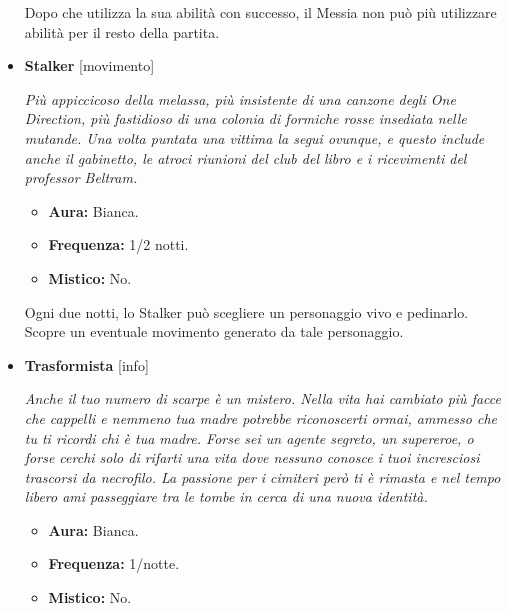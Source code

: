 \documentclass[a4paper,10pt]{article}
\begin{document}
\begin{itemize}
            Dopo che utilizza la sua abilità con successo, il Messia non può più utilizzare abilità per il resto della partita.

      \item \textbf{Stalker} [movimento]

            \emph{Più appiccicoso della melassa, più insistente di una canzone degli One Direction, più fastidioso di una colonia di formiche rosse insediata nelle mutande. Una volta puntata una vittima la segui ovunque, e questo include anche il gabinetto, le atroci riunioni del club del libro e i ricevimenti del professor Beltram.}

            \begin{multicols}{3}
                  \begin{itemize}
                        \item \textbf{Aura:} Bianca.
                        \item \textbf{Frequenza:} 1/2 notti.
                        \item \textbf{Mistico:} No.
                  \end{itemize}
            \end{multicols}

            Ogni due notti, lo Stalker può scegliere un personaggio vivo e pedinarlo. Scopre un eventuale movimento generato da tale personaggio.


      \item \textbf{Trasformista} [info]

            \emph{Anche il tuo numero di scarpe è un mistero. Nella vita hai cambiato più facce che cappelli e nemmeno tua madre potrebbe riconoscerti ormai, ammesso che tu ti ricordi chi è tua madre. Forse sei un agente segreto, un supereroe, o forse cerchi solo di rifarti una vita dove nessuno conosce i tuoi incresciosi trascorsi da necrofilo. La passione per i cimiteri però ti è rimasta e nel tempo libero ami passeggiare tra le tombe in cerca di una nuova identità.}

            \begin{multicols}{3}
                  \begin{itemize}
                        \item \textbf{Aura:} Bianca.
                        \item \textbf{Frequenza:} 1/notte.
                        \item \textbf{Mistico:} No.
                  \end{itemize}
            \end{multicols}


\end{itemize}
\end{document}
